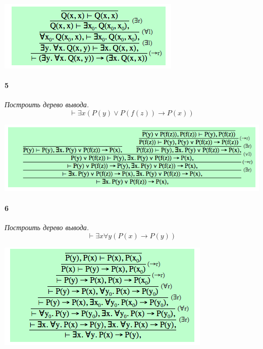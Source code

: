 \documentclass[russian]{article}
\begin{document}
\begin{center}
\includegraphics[scale=0.64]{4.png} 
\end{center}

\paragraph{5} \textit{Построить дерево вывода.
\[
\vdash \exists x (P(y) \vee P(f(z)) \rightarrow P(x))
\]}

\begin{center}
\includegraphics[scale=0.64]{5.png} 
\end{center}

\paragraph{6} \textit{Построить дерево вывода.
\[
\vdash \exists x \forall y (P(x) \rightarrow P(y))
\]}

\begin{center}
\includegraphics[scale=0.64]{6.png} 
\end{center}
\end{document}
